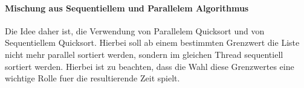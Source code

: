 \documentclass[12pt,twoside,a4paper]{article}
\begin{document}
\paragraph{Mischung aus Sequentiellem und Parallelem Algorithmus}
Die Idee daher ist, die Verwendung von Parallelem Quicksort und von Sequentiellem Quicksort. Hierbei soll ab einem bestimmten Grenzwert die Liste nicht mehr parallel sortiert werden, sondern im gleichen Thread sequentiell sortiert werden. Hierbei ist zu beachten, dass die Wahl diese Grenzwertes eine wichtige Rolle fuer die resultierende Zeit spielt.
\end{document}
